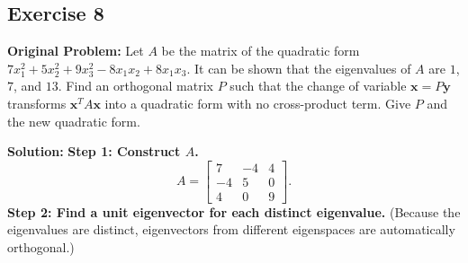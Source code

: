 \documentclass[11pt, letterpaper]{article}
\theoremstyle{definition}
\theoremstyle{remark}
\begin{document}
\hrulefill

\subsection*{Exercise 8}
\textbf{Original Problem:} Let $A$ be the matrix of the quadratic form $7x_1^2 + 5x_2^2 + 9x_3^2 - 8x_1x_2 + 8x_1x_3$. It can be shown that the eigenvalues of $A$ are $1$, $7$, and $13$. Find an orthogonal matrix $P$ such that the change of variable $\mathbf{x} = P\mathbf{y}$ transforms $\mathbf{x}^T A \mathbf{x}$ into a quadratic form with no cross-product term. Give $P$ and the new quadratic form.

\textbf{Solution:}
\textbf{Step 1: Construct $A$.}
\[
A = \begin{bmatrix} 7 & -4 & 4 \\ -4 & 5 & 0 \\ 4 & 0 & 9 \end{bmatrix}.
\]
\textbf{Step 2: Find a unit eigenvector for each distinct eigenvalue.} (Because the eigenvalues are distinct, eigenvectors from different eigenspaces are automatically orthogonal.)
\end{document}

